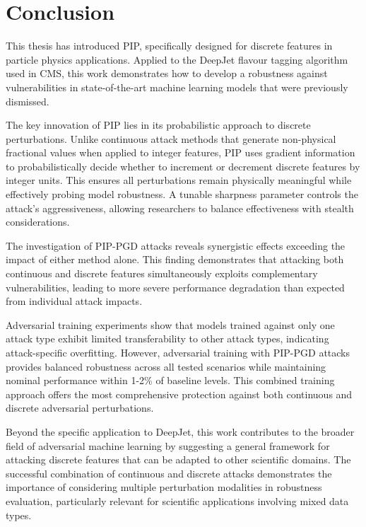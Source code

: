 \chapter{Conclusion}

This thesis has introduced PIP, specifically designed for discrete features in particle physics applications. Applied to the DeepJet flavour tagging algorithm used in CMS, this work demonstrates how to develop a robustness against vulnerabilities in state-of-the-art machine learning models that were previously dismissed.

The key innovation of PIP lies in its probabilistic approach to discrete perturbations. Unlike continuous attack methods that generate non-physical fractional values when applied to integer features, PIP uses gradient information to probabilistically decide whether to increment or decrement discrete features by integer units. This ensures all perturbations remain physically meaningful while effectively probing model robustness. A tunable sharpness parameter controls the attack's aggressiveness, allowing researchers to balance effectiveness with stealth considerations.

The investigation of PIP-PGD attacks reveals synergistic effects exceeding the impact of either method alone. This finding demonstrates that attacking both continuous and discrete features simultaneously exploits complementary vulnerabilities, leading to more severe performance degradation than expected from individual attack impacts.

Adversarial training experiments show that models trained against only one attack type exhibit limited transferability to other attack types, indicating attack-specific overfitting. However, adversarial training with PIP-PGD attacks provides balanced robustness across all tested scenarios while maintaining nominal performance within 1-2\% of baseline levels. This combined training approach offers the most comprehensive protection against both continuous and discrete adversarial perturbations.

Beyond the specific application to DeepJet, this work contributes to the broader field of adversarial machine learning by suggesting a general framework for attacking discrete features that can be adapted to other scientific domains. The successful combination of continuous and discrete attacks demonstrates the importance of considering multiple perturbation modalities in robustness evaluation, particularly relevant for scientific applications involving mixed data types.

